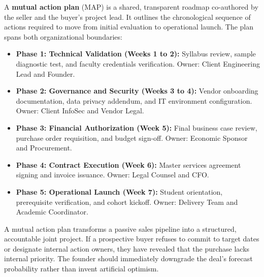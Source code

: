 A \textbf{mutual action plan} (MAP) is a shared, transparent roadmap co-authored by the seller and the buyer's project lead. It outlines the chronological sequence of actions required to move from initial evaluation to operational launch. The plan spans both organizational boundaries:
\begin{itemize}
\item \textbf{Phase 1: Technical Validation (Weeks 1 to 2):} Syllabus review, sample diagnostic test, and faculty credentials verification. Owner: Client Engineering Lead and Founder.
\item \textbf{Phase 2: Governance and Security (Weeks 3 to 4):} Vendor onboarding documentation, data privacy addendum, and IT environment configuration. Owner: Client InfoSec and Vendor Legal.
\item \textbf{Phase 3: Financial Authorization (Week 5):} Final business case review, purchase order requisition, and budget sign-off. Owner: Economic Sponsor and Procurement.
\item \textbf{Phase 4: Contract Execution (Week 6):} Master services agreement signing and invoice issuance. Owner: Legal Counsel and CFO.
\item \textbf{Phase 5: Operational Launch (Week 7):} Student orientation, prerequisite verification, and cohort kickoff. Owner: Delivery Team and Academic Coordinator.
\end{itemize}
A mutual action plan transforms a passive sales pipeline into a structured, accountable joint project. If a prospective buyer refuses to commit to target dates or designate internal action owners, they have revealed that the purchase lacks internal priority. The founder should immediately downgrade the deal's forecast probability rather than invent artificial optimism.
